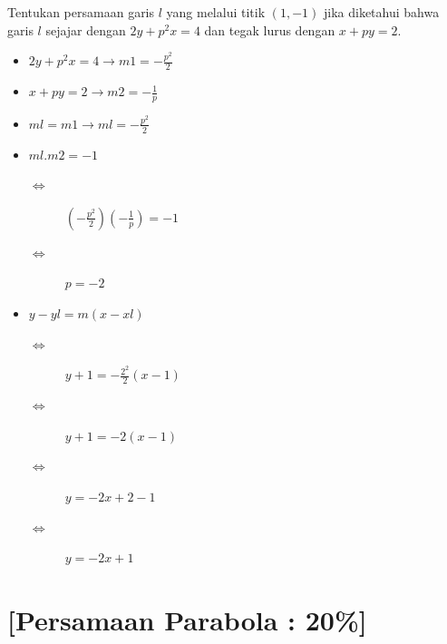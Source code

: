 \documentclass[12pt, a4paper]{article}
\begin{document}
    Tentukan persamaan garis $l$ yang melalui titik $(1,-1)$ jika diketahui bahwa garis $l$ sejajar dengan $2y + p^2x = 4$ dan tegak lurus dengan $x + py = 2$.
    \begin{itemize}
        \item $2y + p^2x = 4\longrightarrow m{\scriptscriptstyle 1}=-\frac{p^2}{2}$
        \item $x + py = 2\longrightarrow m{\scriptscriptstyle 2}=-\frac{1}{p}$
        \item $ml=m{\scriptscriptstyle 1} \longrightarrow ml = -\frac{p^2}{2}$
        \item $ml.m{\scriptscriptstyle 2} = -1$
        \begin{description}
            \item[$\Leftrightarrow$] $(-\frac{p^2}{2})(-\frac{1}{p}) = -1$
            \item[$\Leftrightarrow$] $p=-2$
        \end{description}
        \item $y-yl = m(x-xl)$
        \begin{description}
            \item[$\Leftrightarrow$] $y+1 = -\frac{2^2}{2}(x-1)$
            \item[$\Leftrightarrow$] $y+1 = -2(x-1)$
            \item[$\Leftrightarrow$] $y = -2x   +2-1$
            \item[$\Leftrightarrow$] $y = -2x+1$
        \end{description}
    \end{itemize}
    \pagebreak

    \section{[{\bf Persamaan Parabola} : 20\%]} 
    
\end{document}
